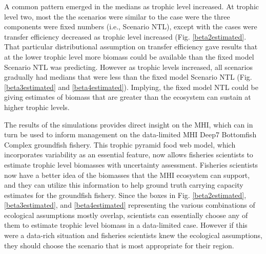 \documentclass[oneside,12pt,final]{sty/ucthesis-CA2012}
\begin{document}
\begin{mainmatter}
\vspace{5mm} 

A common pattern emerged in the medians as trophic level increased. At trophic level two, most the the scenarios were similar to the case were the three components were fixed numbers (i.e., Scenario NTL), except with the cases were transfer efficiency decreased as trophic level increased (Fig. \ref{beta2estimated}. That particular distributional assumption on transfer efficiency gave results that at the lower trophic level more biomass could be available than the fixed model Scenario NTL was predicting. However as trophic levels increased, all scenarios gradually had medians that were less than the fixed model Scenario NTL (Fig. \ref{beta3estimated} and \ref{beta4estimated}). Implying, the fixed model NTL could be giving estimates of biomass that are greater than the ecosystem can sustain at higher trophic levels. 

\vspace{5mm}

The results of the simulations provides direct insight on the MHI, which can in turn be used to inform management on the data-limited MHI Deep7 Bottomfish Complex groundfish fishery. This trophic pyramid food web model, which incorporates variability as an essential feature, now allows fisheries scientists to estimate trophic level biomasses with uncertainty assessment. Fisheries scientists now have a better idea of the biomasses that the MHI ecosystem can support, and they can utilize this information to help ground truth carrying capacity estimates for the groundfish fishery. Since the boxes in Fig. \ref{beta2estimated}, \ref{beta3estimated}, and \ref{beta4estimated} representing the various combinations of ecological assumptions mostly overlap, scientists can essentially choose any of them to estimate trophic level biomass in a data-limited case. However if this were a data-rich situation and fisheries scientists knew the ecological assumptions, they should choose the scenario that is most appropriate for their region.
 
\vspace{5mm} 


\end{mainmatter}
\end{document}
